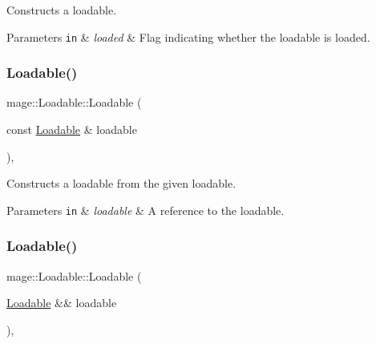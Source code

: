 Constructs a loadable.


\begin{DoxyParams}[1]{Parameters}
\mbox{\tt in}  & {\em loaded} & Flag indicating whether the loadable is loaded. \\
\hline
\end{DoxyParams}
\hypertarget{classmage_1_1_loadable_aaea04657cc6f150659f0ab387f6a5514}{}\label{classmage_1_1_loadable_aaea04657cc6f150659f0ab387f6a5514} 
\subsubsection{\texorpdfstring{Loadable()}{Loadable()}\hspace{0.1cm}{\footnotesize\ttfamily [2/3]}}
{\footnotesize\ttfamily mage\+::\+Loadable\+::\+Loadable (\begin{DoxyParamCaption}\item[{const \hyperlink{classmage_1_1_loadable}{Loadable} \&}]{loadable }\end{DoxyParamCaption})\hspace{0.3cm}{\ttfamily [protected]}, {\ttfamily [default]}}

Constructs a loadable from the given loadable.


\begin{DoxyParams}[1]{Parameters}
\mbox{\tt in}  & {\em loadable} & A reference to the loadable. \\
\hline
\end{DoxyParams}
\hypertarget{classmage_1_1_loadable_aad6ac6495924e0787c377d665a076f2a}{}\label{classmage_1_1_loadable_aad6ac6495924e0787c377d665a076f2a} 
\subsubsection{\texorpdfstring{Loadable()}{Loadable()}\hspace{0.1cm}{\footnotesize\ttfamily [3/3]}}
{\footnotesize\ttfamily mage\+::\+Loadable\+::\+Loadable (\begin{DoxyParamCaption}\item[{\hyperlink{classmage_1_1_loadable}{Loadable} \&\&}]{loadable }\end{DoxyParamCaption})\hspace{0.3cm}{\ttfamily [protected]}, {\ttfamily [default]}}

